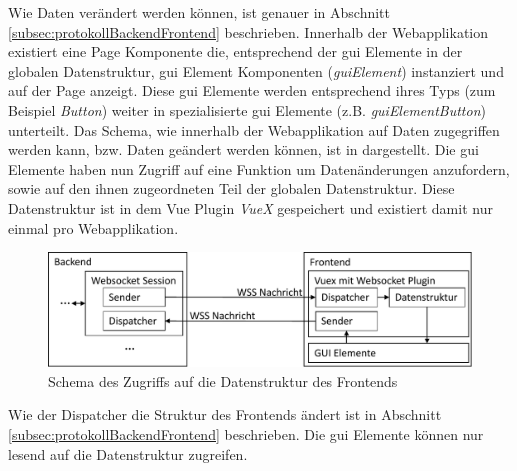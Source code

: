 Wie Daten verändert werden können, ist genauer in Abschnitt \ref{subsec:protokollBackendFrontend} beschrieben.
Innerhalb der Webapplikation existiert eine Page Komponente die, entsprechend der \ac{gui} Elemente in der globalen Datenstruktur, 
\ac{gui} Element Komponenten (\emph{guiElement}) instanziert und auf der Page anzeigt.
Diese \ac{gui} Elemente werden entsprechend ihres Typs (zum Beispiel \emph{Button}) weiter in spezialisierte \ac{gui} Elemente (z.B. \emph{guiElementButton}) unterteilt.
Das Schema, wie innerhalb der Webapplikation auf Daten zugegriffen werden kann, bzw. Daten geändert werden können,
ist in  dargestellt.
Die \ac{gui} Elemente haben nun Zugriff auf eine Funktion um Datenänderungen anzufordern, 
sowie auf den ihnen zugeordneten Teil der globalen Datenstruktur.
Diese Datenstruktur ist in dem Vue Plugin \emph{VueX} gespeichert und existiert damit nur einmal pro Webapplikation.  
\begin{figure}[ht]
  \centering
  \includegraphics[width=\textwidth]{content/hauptteil/systemEntwurf/res/datenzugriffFrontend.pdf}
  \caption[Datenzugriff innerhalb des Frontends]{Schema des Zugriffs auf die Datenstruktur des Frontends}
  \label{fig:dataFlowFrontend}
\end{figure}
Wie der Dispatcher die Struktur des Frontends ändert ist in Abschnitt \ref{subsec:protokollBackendFrontend} beschrieben.
Die \ac{gui} Elemente können nur lesend auf die Datenstruktur zugreifen.


